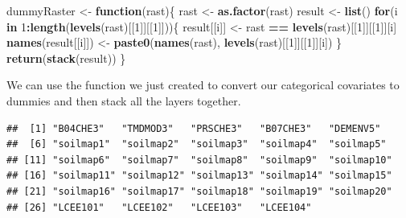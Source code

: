 \documentclass[10pt,b5paper,]{book}
\newenvironment{Shaded}{\begin{snugshade}}{\end{snugshade}}
\newcommand{\CommentTok}[1]{\textcolor[rgb]{0.56,0.35,0.01}{\textit{#1}}}
\newcommand{\ControlFlowTok}[1]{\textcolor[rgb]{0.13,0.29,0.53}{\textbf{#1}}}
\newcommand{\DecValTok}[1]{\textcolor[rgb]{0.00,0.00,0.81}{#1}}
\newcommand{\KeywordTok}[1]{\textcolor[rgb]{0.13,0.29,0.53}{\textbf{#1}}}
\newcommand{\NormalTok}[1]{#1}
\newcommand{\OperatorTok}[1]{\textcolor[rgb]{0.81,0.36,0.00}{\textbf{#1}}}
\newcommand{\StringTok}[1]{\textcolor[rgb]{0.31,0.60,0.02}{#1}}
\theoremstyle{definition}
\theoremstyle{definition}
\theoremstyle{definition}
\theoremstyle{remark}
\begin{document}
\begin{Shaded}
\begin{Highlighting}[]
\NormalTok{dummyRaster <-}\StringTok{ }\ControlFlowTok{function}\NormalTok{(rast)\{}
\NormalTok{  rast <-}\StringTok{ }\KeywordTok{as.factor}\NormalTok{(rast)}
\NormalTok{  result <-}\StringTok{ }\KeywordTok{list}\NormalTok{()}
  \ControlFlowTok{for}\NormalTok{(i }\ControlFlowTok{in} \DecValTok{1}\OperatorTok{:}\KeywordTok{length}\NormalTok{(}\KeywordTok{levels}\NormalTok{(rast)[[}\DecValTok{1}\NormalTok{]][[}\DecValTok{1}\NormalTok{]]))\{}
\NormalTok{    result[[i]] <-}\StringTok{ }\NormalTok{rast }\OperatorTok{==}\StringTok{ }\KeywordTok{levels}\NormalTok{(rast)[[}\DecValTok{1}\NormalTok{]][[}\DecValTok{1}\NormalTok{]][i]}
    \KeywordTok{names}\NormalTok{(result[[i]]) <-}\StringTok{ }\KeywordTok{paste0}\NormalTok{(}\KeywordTok{names}\NormalTok{(rast), }
                                 \KeywordTok{levels}\NormalTok{(rast)[[}\DecValTok{1}\NormalTok{]][[}\DecValTok{1}\NormalTok{]][i])}
\NormalTok{  \}}
  \KeywordTok{return}\NormalTok{(}\KeywordTok{stack}\NormalTok{(result))}
\NormalTok{\}}
\end{Highlighting}
\end{Shaded}

We can use the function we just created to convert our categorical
covariates to dummies and then stack all the layers together.

\begin{Shaded}
\end{Shaded}

\begin{verbatim}
##  [1] "B04CHE3"   "TMDMOD3"   "PRSCHE3"   "B07CHE3"   "DEMENV5"  
##  [6] "soilmap1"  "soilmap2"  "soilmap3"  "soilmap4"  "soilmap5" 
## [11] "soilmap6"  "soilmap7"  "soilmap8"  "soilmap9"  "soilmap10"
## [16] "soilmap11" "soilmap12" "soilmap13" "soilmap14" "soilmap15"
## [21] "soilmap16" "soilmap17" "soilmap18" "soilmap19" "soilmap20"
## [26] "LCEE101"   "LCEE102"   "LCEE103"   "LCEE104"
\end{verbatim}
\end{document}
